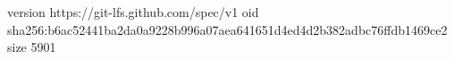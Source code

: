 version https://git-lfs.github.com/spec/v1
oid sha256:b6ac52441ba2da0a9228b996a07aea641651d4ed4d2b382adbc76ffdb1469ce2
size 5901
